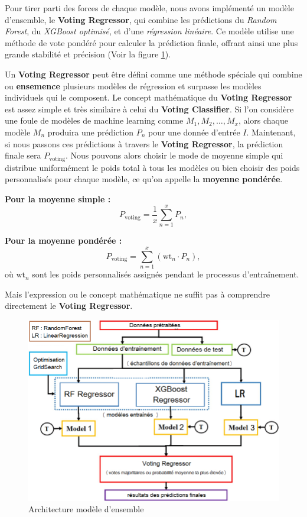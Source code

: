 Pour tirer parti des forces de chaque modèle, nous avons implémenté un modèle d'ensemble, le \textbf{Voting Regressor}, qui combine les prédictions du \textit{Random Forest}, du \textit{XGBoost optimisé}, et d'une \textit{régression linéaire}. Ce modèle utilise une méthode de vote pondéré pour calculer la prédiction finale, offrant ainsi une plus grande stabilité et précision (Voir la figure \ref{fig:schemaensemble}).

Un \textbf{Voting Regressor} peut être défini comme une méthode spéciale qui combine ou \textbf{ensemence} plusieurs modèles de régression et surpasse les modèles individuels qui le composent. Le concept mathématique du \textbf{Voting Regressor} est assez simple et très similaire à celui du \textbf{Voting Classifier}. Si l'on considère une foule de modèles de machine learning comme \(M_1, M_2,\dots , M_x\), alors chaque modèle \(M_n\) produira une prédiction \(P_n\) pour une donnée d'entrée \(I\). Maintenant, si nous passons ces prédictions à travers le \textbf{Voting Regressor}, la prédiction finale sera \(P_{\text{voting}}\). Nous pouvons alors choisir le mode de moyenne simple qui distribue uniformément le poids total à tous les modèles ou bien choisir des poids personnalisés pour chaque modèle, ce qu'on appelle la \textbf{moyenne pondérée}.

\textbf{Pour la moyenne simple :} 
\[
P_{\text{voting}}=\frac{1}{x}\sum_{n=1}^x{P_n}  ,     
\]

\textbf{Pour la moyenne pondérée :} 
\[
P_{\text{voting}}=\sum_{n=1}^x (\text{wt}_{n} \cdot P_n) ,
\]
où \(\text{wt}_n\) sont les poids personnalisés assignés pendant le processus d'entraînement.

Mais l'expression ou le concept mathématique ne suffit pas à comprendre directement le \textbf{Voting Regressor}.


\begin{figure}[h!]
	\centering
	\includegraphics[width=0.9\linewidth]{images/Architecture}
	\caption{Architecture modèle d'ensemble}
	\label{fig:schemaensemble}
\end{figure}
